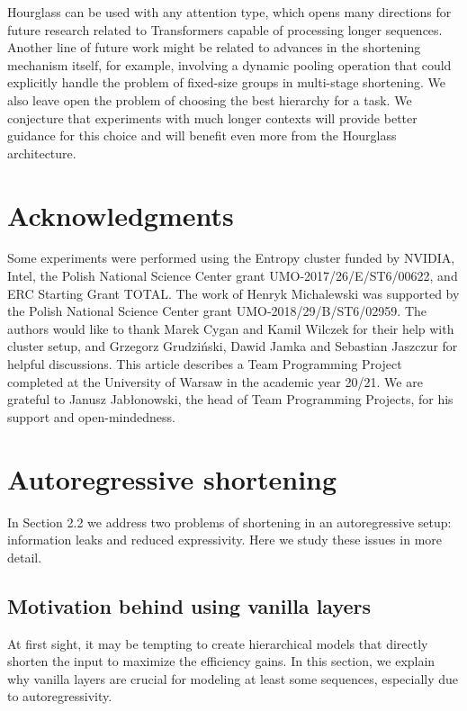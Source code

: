 \documentclass[11pt]{article}
\begin{document}
Hourglass can be used with any attention type, which opens many directions for future research related to Transformers capable of processing longer sequences. Another line of future work might be related to advances in the shortening mechanism itself, for example, involving a dynamic pooling operation that could explicitly handle the problem of fixed-size groups in multi-stage shortening.
We also leave open the problem of choosing the best hierarchy for a task. We conjecture that experiments with much longer contexts will provide better guidance for this choice and will benefit even more from the Hourglass architecture. 

\section{Acknowledgments}
Some experiments were performed using the Entropy cluster funded by NVIDIA, Intel, the Polish National Science Center grant UMO-2017/26/E/ST6/00622, and  ERC Starting Grant TOTAL. The work of Henryk Michalewski was supported by the Polish National Science Center grant UMO-2018/29/B/ST6/02959. The authors would like to thank Marek Cygan and Kamil Wilczek for their help with cluster setup, and Grzegorz Grudziński, Dawid Jamka and Sebastian Jaszczur for helpful discussions. This article describes a Team Programming Project completed at the University of Warsaw in the academic year 20/21. We are grateful to Janusz Jabłonowski, the head of Team Programming Projects,  for his support and open-mindedness.

\egroup 





\clearpage
\appendix
\section{Autoregressive shortening}

In Section 2.2 we address two problems of shortening in an autoregressive setup: information leaks and reduced expressivity. Here we study these issues in more detail.

\subsection{Motivation behind using vanilla layers}\label{sec:appendix.reduced}

At first sight, it may be tempting to create hierarchical models that directly shorten the input to maximize the efficiency gains. In this section, we explain why vanilla layers are crucial for modeling at least some sequences, especially due to autoregressivity.
\end{document}
